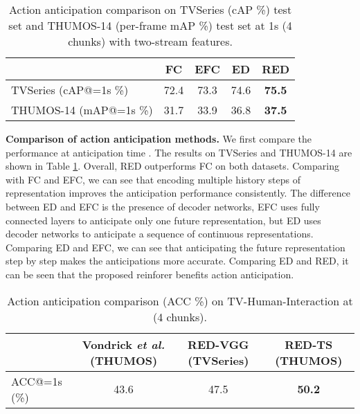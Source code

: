 \documentclass{bmvc2k}
\begin{document}
\begin{table}[h]
\centering
\caption{Action anticipation comparison on TVSeries (cAP \%) test set and THUMOS-14 (per-frame mAP \%) test set at 1s (4 chunks) with two-stream features. }
\label{tv-ta1s}
\begin{tabular}{l|cccc}
\hline
    & FC & EFC & ED & RED \\ \hline
TVSeries (cAP@=1s \%) &  72.4  &   73.3   &  74.6  &  \textbf{75.5}   \\ \hline
THUMOS-14 (mAP@=1s \%) &  31.7  &   33.9   &  36.8  &  \textbf{37.5}   \\ \hline
\end{tabular}
\end{table}

\textbf{Comparison of action anticipation methods.}
We first compare the performance at anticipation time . The results on TVSeries and THUMOS-14 are shown in Table \ref{tv-ta1s}. Overall, RED outperforms FC on both datasets. Comparing with FC and EFC, we can see that encoding multiple history steps of representation improves the anticipation performance consistently. 
The difference between ED and EFC is the presence of  decoder networks, EFC uses fully connected layers to anticipate only one future representation, but ED uses decoder networks to anticipate a sequence of continuous representations. Comparing ED and EFC, we can see that anticipating the future representation step by step makes the anticipations more accurate. Comparing ED and RED, it can be seen that the proposed reinforer benefits action anticipation. 

\begin{table}[h]\footnotesize
\centering
\caption{Action anticipation comparison (ACC \%) on TV-Human-Interaction at  (4 chunks).}
\label{interaction-ta1s}
\begin{tabular}{l|ccc}
\hline
    & Vondrick \emph{et al.}\cite{vondrick2016anticipating} (THUMOS) & RED-VGG (TVSeries) & RED-TS (THUMOS) \\ \hline
ACC@=1s (\%) &  43.6    &  47.5  &  \textbf{50.2}   \\ \hline
\end{tabular}
\end{table}
\end{document}
